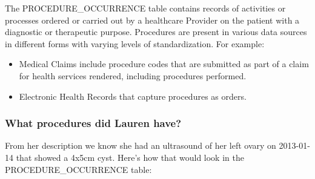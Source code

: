 \documentclass[11pt]{book}
\providecommand{\tightlist}{%
  \setlength{\itemsep}{0pt}\setlength{\parskip}{0pt}}
\theoremstyle{definition}
\theoremstyle{definition}
\theoremstyle{definition}
\theoremstyle{remark}
\begin{document}
The PROCEDURE\_OCCURRENCE table contains records of activities or processes ordered or carried out by a healthcare Provider on the patient with a diagnostic or therapeutic purpose. Procedures are present in various data sources in different forms with varying levels of standardization. For example:

\begin{itemize}
\tightlist
\item
  Medical Claims include procedure codes that are submitted as part of a claim for health services rendered, including procedures performed.
\item
  Electronic Health Records that capture procedures as orders.
\end{itemize}

\hypertarget{what-procedures-did-lauren-have}{%
\subsubsection*{What procedures did Lauren have?}\label{what-procedures-did-lauren-have}}

From her description we know she had an ultrasound of her left ovary on 2013-01-14 that showed a 4x5cm cyst. Here's how that would look in the PROCEDURE\_OCCURRENCE table:
\end{document}
